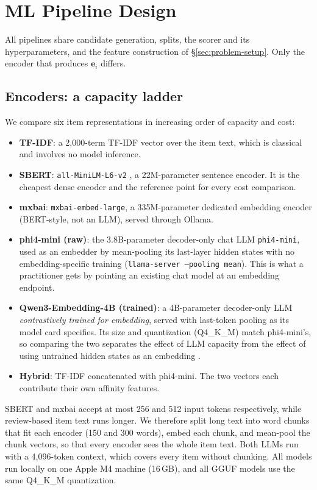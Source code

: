 \section{ML Pipeline Design}
\label{sec:pipeline-design}

All pipelines share candidate generation, splits, the scorer and its
hyperparameters, and the feature construction of
\S\ref{sec:problem-setup}. Only the encoder that produces
$\mathbf{e}_i$ differs.

\subsection{Encoders: a capacity ladder}
\label{sec:baseline-pipelines}
\label{sec:large-embedding-pipeline}
\label{sec:llm-augmented-pipelines}
\label{sec:hybrid-pipelines}
We compare six item representations in increasing order of capacity and
cost:
\begin{itemize}
  \item \textbf{TF-IDF}: a 2{,}000-term TF-IDF vector over the item
    text, which is classical and involves no model inference.
  \item \textbf{SBERT}: \texttt{all-MiniLM-L6-v2} \cite{sbert}, a
    22M-parameter sentence encoder. It is the cheapest dense encoder
    and the reference point for every cost comparison.
  \item \textbf{mxbai}: \texttt{mxbai-embed-large}, a 335M-parameter
    dedicated embedding encoder (BERT-style, not an LLM), served
    through Ollama.
  \item \textbf{phi4-mini (raw)}: the 3.8B-parameter decoder-only chat
    LLM \texttt{phi4-mini}, used as an embedder by mean-pooling its
    last-layer hidden states with no embedding-specific training
    (\texttt{llama-server --pooling mean}). This is what a practitioner
    gets by pointing an existing chat model at an embedding endpoint.
  \item \textbf{Qwen3-Embedding-4B (trained)}: a 4B-parameter
    decoder-only LLM \emph{contrastively trained for embedding}, served
    with last-token pooling as its model card specifies. Its size and
    quantization (Q4\_K\_M) match phi4-mini's, so comparing the two
    separates the effect of LLM capacity from the effect of using
    untrained hidden states as an embedding
    \cite{sgpt, llm2vec, e5-mistral}.
  \item \textbf{Hybrid}: TF-IDF concatenated with phi4-mini. The two
    vectors each contribute their own affinity features.
\end{itemize}
SBERT and mxbai accept at most 256 and 512 input tokens respectively,
while review-based item text runs longer. We therefore split long text
into word chunks that fit each encoder (150 and 300 words), embed each
chunk, and mean-pool the chunk vectors, so that every encoder sees the
whole item text. Both LLMs run with a 4{,}096-token context, which
covers every item without chunking. All models run locally on one Apple
M4 machine (16\,GB), and all GGUF models use the same Q4\_K\_M
quantization.

